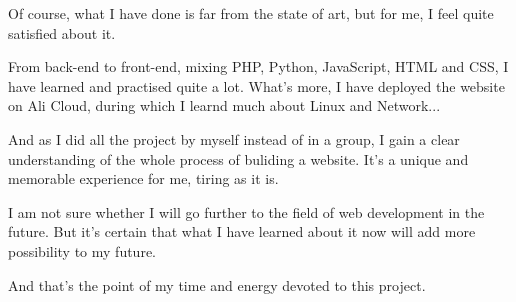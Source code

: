 \documentclass[a4paper]{article}
\begin{document}
Of course, what I have done is far from the state of art, but for me, I feel quite satisfied about it. 

From back-end to front-end, mixing PHP, Python, JavaScript, HTML and CSS, I have learned and practised 
quite a lot. What's more, I have deployed the website on Ali Cloud, during which
I learnd much about Linux and Network...

And as I did all the project by myself instead of in a group, I gain a clear understanding of the 
whole process of buliding a website. It's a unique and memorable experience for me, tiring as it is.

I am not sure whether I will go further to the field of web development in the future. But it's certain
that what I have learned about it now will add more possibility to my future. 

And that's the point of my time and energy devoted to this project.



 
\end{document}
